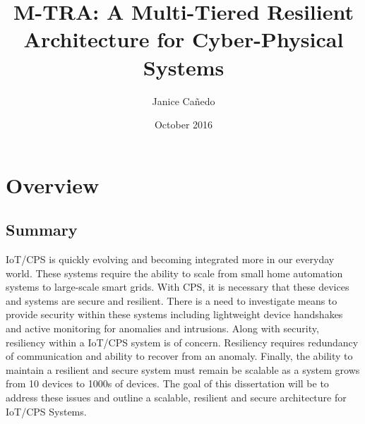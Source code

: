 \documentclass[]{report}
\title{M-TRA: A Multi-Tiered Resilient Architecture for Cyber-Physical Systems}
\author{Janice Ca\~nedo}
\date{October 2016} %
\begin{document}
\maketitle 

{}

\tableofcontents


\normalem       %

\chapter{Overview}  %

{}








\section{Summary}

IoT/CPS is quickly evolving and becoming integrated more in our everyday world. These systems require the ability to scale from small home automation systems to large-scale smart grids. With CPS, it is necessary that these devices and systems are secure and resilient. There is a need to investigate means to provide security within these systems including lightweight device handshakes and active monitoring for anomalies and intrusions. Along with security, resiliency within a IoT/CPS system is of concern. Resiliency requires redundancy of communication and ability to recover from an anomaly. Finally, the ability to maintain a resilient and secure system must remain be scalable as a system grows from 10 devices to 1000s of devices. The goal of this dissertation will be to address these issues and outline a scalable, resilient and secure architecture for IoT/CPS Systems.
\end{document}
